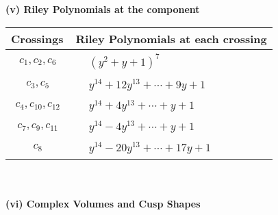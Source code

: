 \documentclass[1p]{elsarticle_modified}
\theoremstyle{definition}
\begin{document}
\newpage\renewcommand{\arraystretch}{1}
\flushleft \textbf{(v) Riley Polynomials at the component}\newline \\
\begin{tabular}{m{50pt}|m{274pt}}
Crossings & \hspace{64pt}Riley Polynomials at each crossing \\
\hline $$\begin{aligned}c_{1},c_{2},c_{6}\end{aligned}$$&$\begin{aligned}
&(y^2+y+1)^7
\end{aligned}$\\
\hline $$\begin{aligned}c_{3},c_{5}\end{aligned}$$&$\begin{aligned}
&y^{14}+12 y^{13}+\cdots+9 y+1
\end{aligned}$\\
\hline $$\begin{aligned}c_{4},c_{10},c_{12}\end{aligned}$$&$\begin{aligned}
&y^{14}+4 y^{13}+\cdots+y+1
\end{aligned}$\\
\hline $$\begin{aligned}c_{7},c_{9},c_{11}\end{aligned}$$&$\begin{aligned}
&y^{14}-4 y^{13}+\cdots+y+1
\end{aligned}$\\
\hline $$\begin{aligned}c_{8}\end{aligned}$$&$\begin{aligned}
&y^{14}-20 y^{13}+\cdots+17 y+1
\end{aligned}$\\
\hline
\end{tabular}\\~\\
\newpage\flushleft \textbf{(vi) Complex Volumes and Cusp Shapes}
\end{document}
